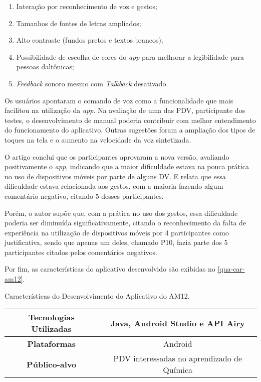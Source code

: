 \begin{enumerate}
  \item Interação por reconhecimento de voz e gestos;
  \item Tamanhos de fontes de letras ampliados;
  \item Alto contraste (fundos pretos e textos brancos);
  \item Possibilidade de escolha de cores do \emph{app} para melhorar a legibilidade para pessoas daltônicas;
  \item \emph{Feedback} sonoro mesmo com \emph{Talkback} desativado.
\end{enumerate}

Os usuários apontaram o comando de voz como a funcionalidade que mais facilitou na utilização da \emph{app}.
Na avaliação de uma das PDV, participante dos testes, o desenvolvimento de manual poderia contribuir com melhor entendimento do funcionamento do aplicativo.
Outras sugestões foram a ampliação dos tipos de toques na tela e o aumento na velocidade da voz sintetizada.

O artigo conclui que os participantes aprovaram a nova versão, avaliando positivamente o \emph{app}, indicando que a maior dificuldade estava na pouca prática no uso de dispositivos móveis por parte de alguns DV\@.
E relata que essa dificuldade estava relacionada aos gestos, com a maioria fazendo algum comentário negativo, citando 5 desses participantes.

Porém, o autor supõe que, com a prática no uso dos gestos, essa dificuldade poderia ser diminuída significativamente, citando o reconhecimento da falta de experiência na utilização de dispositivos móveis por 4 participantes como justificativa, sendo que apenas um deles, chamado P10, fazia parte dos 5 participantes citados pelos comentários negativos.

Por fim, as características do aplicativo desenvolvido são exibidas no \autoref{qua-car-am12}.

\begin{quadro}[htb!]
  \caption{\label{qua-car-am12}Características do Desenvolvimento do Aplicativo do AM12.}
  \begin{tabular}{|c|c|}
    \hline
    \textbf{Tecnologias Utilizadas} & Java, Android Studio e API Airy            \\ \hline
    \textbf{Plataformas}            & Android                                    \\ \hline
    \textbf{Público-alvo}           & PDV interessadas no aprendizado de Química \\
    \hline
  \end{tabular}
\end{quadro}

